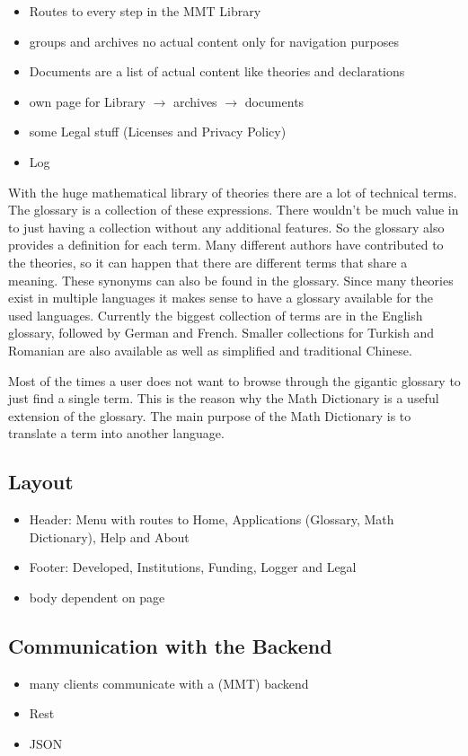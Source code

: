 \documentclass[11pt,a4paper]{article}
\begin{document}
\begin{itemize}
\item Routes to every step in the MMT Library
\item groups and archives no actual content only for navigation purposes
\item Documents are a list of actual content like theories and declarations
\item own page for Library $\rightarrow$ archives $\rightarrow$ documents
\item some Legal stuff (Licenses and Privacy Policy)
\item Log
\end{itemize}
With the huge mathematical library of theories there are a lot of technical terms. The glossary is a collection of these expressions. There wouldn't be much value in to just having a collection without any additional features. So the glossary also provides a definition for each term. Many different authors have contributed to the theories, so it can happen that there are different terms that share a meaning. These synonyms can also be found in the glossary. Since many theories exist in multiple languages it makes sense to have a glossary available for the used languages. Currently the biggest collection of terms are in the English glossary, followed by German and French. Smaller collections for Turkish and Romanian are also available as well as simplified and traditional Chinese.


Most of the times a user does not want to browse through the gigantic glossary to just find a single term. This is the reason why the Math Dictionary is a useful extension of the glossary.
The main purpose of the Math Dictionary is to translate a term into another language.

\subsection{Layout}
\begin{itemize}
\item Header: Menu with routes to Home, Applications (Glossary, Math Dictionary), Help and About
\item Footer: Developed, Institutions, Funding, Logger and Legal 
\item body dependent on page
\end{itemize}

\subsection{Communication with the Backend}
\begin{itemize}
\item many clients communicate with a (MMT) backend
\item Rest
\item JSON
\end{itemize}
\end{document}
